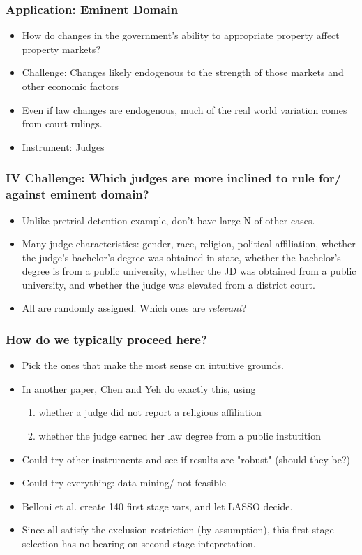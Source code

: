 \begin{frame}
  \frametitle{Application: Eminent Domain}
  \begin{itemize}
    \item How do changes in the government's ability to appropriate property affect property markets?
    \item Challenge: Changes likely endogenous to the strength of those markets and other economic factors
    \item Even if law changes are endogenous, much of the real world variation comes from court rulings. 
    \item Instrument: Judges
   \end{itemize}
\end{frame}

\begin{frame}
  \frametitle{IV Challenge: Which judges are more inclined to rule for/ against eminent domain?}
  \begin{itemize}
    \item Unlike pretrial detention example, don't have large N of other cases. 
    \item Many judge characteristics: gender, race, religion, political affiliation, whether the judge's bachelor's degree was obtained in-state, whether the bachelor's degree is from a public university, whether the JD was obtained from a public university, and whether the judge was elevated from a district court. 
    \item All are randomly assigned. Which ones are \textit{relevant}? 
   \end{itemize}
\end{frame}

\begin{frame}
  \frametitle{How do we typically proceed here?}
  \begin{itemize}
    \item Pick the ones that make the most sense on intuitive grounds. 
    \item In another paper, Chen and Yeh do exactly this, using  
    \begin{enumerate}
      \item whether a judge did not report a religious affiliation
      \item whether the judge earned her law degree from a public instutition
    \end{enumerate}
    \item Could try other instruments and see if results are "robust" (should they be?)
    \item Could try everything: data mining/ not feasible
    \item Belloni et al. create 140 first stage vars, and let LASSO decide.
    \item Since all satisfy the exclusion restriction (by assumption), this first stage selection has no bearing on second stage intepretation. 
   \end{itemize}
\end{frame}

